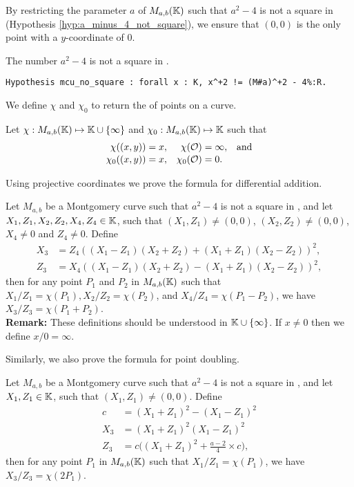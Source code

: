 By restricting the parameter $a$ of $M_{a,b}(\mathbb{K})$ such that $a^2-4$ is not a
square in \K (Hypothesis \ref{hyp:a_minus_4_not_square}),
we ensure that $(0,0)$ is the only point with a $y$-coordinate of $0$.
\begin{hypothesis}
  \label{hyp:a_minus_4_not_square}
  The number $a^2-4$ is not a square in \K.
\end{hypothesis}
\begin{lstlisting}[language=Coq]
Hypothesis mcu_no_square : forall x : K, x^+2 != (M#a)^+2 - 4%:R.
\end{lstlisting}

We define $\chi$ and $\chi_0$ to return the \xcoord of points on a curve.
\begin{dfn}
  Let $\chi : M_{a,b}(\mathbb{K}) \mapsto \mathbb{K} \cup \{\infty\}$ and $\chi_0 : M_{a,b}(\mathbb{K}) \mapsto \mathbb{K}$ such that
  \vspace{-0.5em}
  \begin{align*}
    \chi((x,y))   & = x, & \chi(\mathcal{O})   & = \infty, &  & \text{and} \\[-0.5ex]
    \chi_0((x,y)) & = x, & \chi_0(\mathcal{O}) & = 0.
  \end{align*}
\end{dfn}

Using projective coordinates we prove the formula for differential addition.%
\begin{lemma}
  \label{lemma:xADD}
  Let $M_{a,b}$ be a Montgomery curve such that $a^2-4$ is not a square in \K, and
  let $X_1, Z_1, X_2, Z_2, X_4, Z_4 \in \mathbb{K}$, such that $(X_1,Z_1) \neq (0,0)$,
  $(X_2,Z_2) \neq (0,0)$, $X_4 \neq 0$ and $Z_4 \neq 0$.
  Define
  \vspace{-0.5em}
  \begin{align*}
    X_3 & = Z_4((X_1 - Z_1)(X_2+Z_2) + (X_1+Z_1)(X_2-Z_2))^2, \\[-0.5ex]
    Z_3 & = X_4((X_1 - Z_1)(X_2+Z_2) - (X_1+Z_1)(X_2-Z_2))^2,
  \end{align*}
  then for any point $P_1$ and $P_2$ in $M_{a,b}(\mathbb{K})$ such that
  $X_1/Z_1 = \chi(P_1), X_2/Z_2 = \chi(P_2)$, and $X_4/Z_4 = \chi(P_1 - P_2)$,
  we have $X_3/Z_3 = \chi(P_1+P_2)$.\\
  \textbf{Remark:}
  These definitions should be understood in $\mathbb{K} \cup \{\infty\}$.
  If $x\ne 0$ then we define $x/0 = \infty$.
\end{lemma}
Similarly, we also prove the formula for point doubling.%
\begin{lemma}
  \label{lemma:xDBL}
  Let $M_{a,b}$ be a Montgomery curve such that $a^2-4$ is not a square in \K, and
  let $X_1, Z_1 \in \mathbb{K}$, such that $(X_1,Z_1) \neq (0,0)$. Define
  \begin{align*}
    c   & = (X_1 + Z_1)^2 - (X_1 - Z_1)^2                   \\[-0.5ex]
    X_3 & = (X_1 + Z_1)^2(X_1-Z_1)^2                        \\[-0.5ex]
    Z_3 & = c\Big((X_1 + Z_1)^2+\frac{a-2}{4}\times c\Big),
  \end{align*}
  then for any point $P_1$ in $M_{a,b}(\mathbb{K})$ such that $X_1/Z_1 = \chi(P_1)$,
  we have $X_3/Z_3 = \chi(2P_1)$.
\end{lemma}

